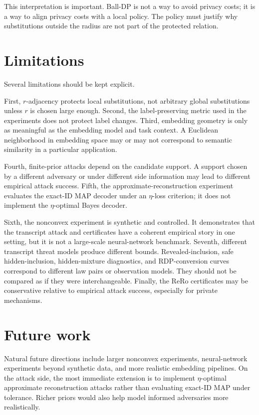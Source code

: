 \documentclass[11pt,a4paper]{report}
\theoremstyle{plain}
\theoremstyle{definition}
\theoremstyle{remark}
\begin{document}
This interpretation is important.  Ball-DP is not a way to avoid privacy costs; it is a way to align privacy costs with a local policy.  The policy must justify why substitutions outside the radius are not part of the protected relation.

\section{Limitations}
\label{sec:limitations}

Several limitations should be kept explicit.

First, $r$-adjacency protects local substitutions, not arbitrary global substitutions unless $r$ is chosen large enough.  Second, the label-preserving metric used in the experiments does not protect label changes.  Third, embedding geometry is only as meaningful as the embedding model and task context.  A Euclidean neighborhood in embedding space may or may not correspond to semantic similarity in a particular application.

Fourth, finite-prior attacks depend on the candidate support.  A support chosen by a different adversary or under different side information may lead to different empirical attack success.  Fifth, the approximate-reconstruction experiment evaluates the exact-ID MAP decoder under an $\eta$-loss criterion; it does not implement the $\eta$-optimal Bayes decoder.

Sixth, the nonconvex experiment is synthetic and controlled.  It demonstrates that the transcript attack and certificates have a coherent empirical story in one setting, but it is not a large-scale neural-network benchmark.  Seventh, different transcript threat models produce different bounds.  Revealed-inclusion, safe hidden-inclusion, hidden-mixture diagnostics, and RDP-conversion curves correspond to different law pairs or observation models.  They should not be compared as if they were interchangeable.  Finally, the ReRo certificates may be conservative relative to empirical attack success, especially for private mechanisms.

\section{Future work}
\label{sec:future-work}

Natural future directions include larger nonconvex experiments, neural-network experiments beyond synthetic data, and more realistic embedding pipelines.  On the attack side, the most immediate extension is to implement $\eta$-optimal approximate reconstruction attacks rather than evaluating exact-ID MAP under tolerance.  Richer priors would also help model informed adversaries more realistically.
\end{document}
